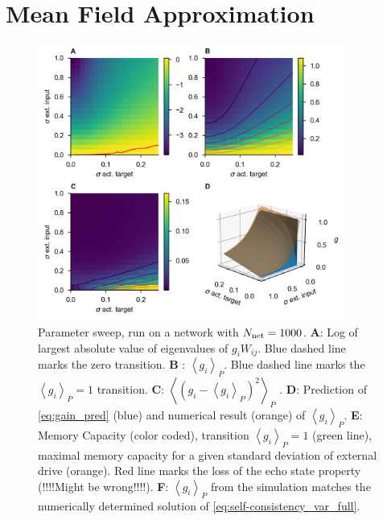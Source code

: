 \documentclass[10pt,a4paper]{article}
\newcommand{\avgp}[1]{\left< #1 \right>_P}
\begin{document}
\section{Mean Field Approximation}

\begin{figure}[t]
	\centering
	\includegraphics[width=0.9\textwidth]{../plots/std_in_std_target_sweep_fig.png}
	\caption{Parameter sweep, run on a network with $N_{\rm net}=1000$. {\bf A}: Log of largest absolute value of eigenvalues of $g_i W_{ij}$. Blue dashed line marks the zero transition. {\bf B} : $\avgp{g_i}$.  Blue dashed line marks the $\avgp{g_i} = 1$ transition. {\bf C}: $\avgp{(g_i - \avgp{g_i})^2}$ . {\bf D}: Prediction of \eqref{eq:gain_pred} (blue) and numerical result (orange) of $\avgp{g_i}$. {\bf E}: Memory Capacity (color coded), transition $\avgp{g_i} = 1$ (green line), maximal memory capacity for a given standard deviation of external drive (orange). Red line marks the loss of the echo state property (!!!!Might be wrong!!!!). {\bf F}: $\avgp{g_i}$ from the simulation matches the numerically determined solution of \eqref{eq:self-consistency_var_full}.}
	\label{fig:gain_std_in_std_targ_sweep}
\end{figure} 
\end{document}
